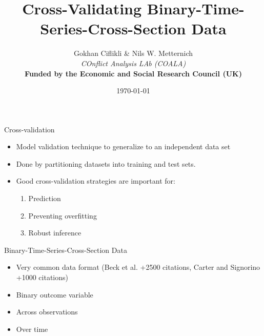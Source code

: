 \documentclass{beamer}
\begin{document}
\title[UCL]
{
Cross-Validating Binary-Time-Series-Cross-Section Data}
\author[PSA PolMeth]
{
Gokhan Ciflikli \& Nils W. Metternich   \\[3ex]
\footnotesize{\emph{COnflict Analysis LAb (COALA)}}\\
\textbf{Funded by the Economic and Social Research Council (UK)}}

\date{\today}

\begin{frame}
\titlepage
\end{frame}

\begin{frame}{Cross-validation}
\begin{itemize} 
\item Model validation technique to generalize to an independent data set
\item Done by partitioning datasets into training and test sets.
\end{itemize}
\begin{itemize}
\item Good cross-validation strategies are important for:
\begin{enumerate}
\item Prediction
\item Preventing overfitting
\item Robust inference
\end{enumerate}
\end{itemize}

\end{frame}

\begin{frame}{Binary-Time-Series-Cross-Section Data}
\begin{itemize}
\item Very common data format (Beck et al. +2500 citations, Carter and Signorino +1000 citations)
\item Binary outcome variable
\item Across observations 
\item Over time
\end{itemize}
\end{frame}
\end{document}
